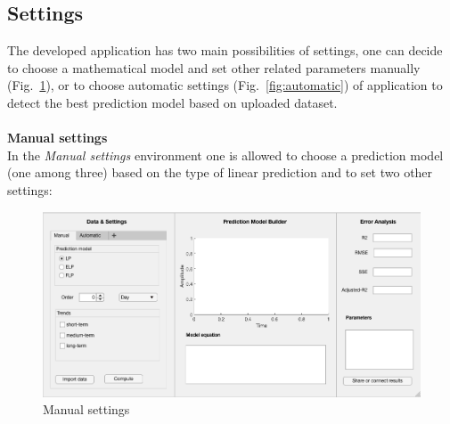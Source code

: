         
        \subsection{Settings}\label{subsec:setting}
        The developed application has two main possibilities of settings, one can decide to choose a mathematical model and set other related parameters manually (Fig.~\ref{fig:manual}), or to choose automatic settings (Fig.~\ref{fig:automatic}) of application to detect the best prediction model
        based on uploaded dataset.\\
        \\
        \textbf{Manual settings}\\
     In the \emph{Manual settings} environment one is allowed to choose a prediction model (one among three) based on the type of linear prediction and to set two other settings:
       \begin{figure}[h!]
        \centering
	   \includegraphics[width=\textwidth]{figures/manual.png}
            \caption{Manual settings}
            \label{fig:manual}
    \end{figure}



